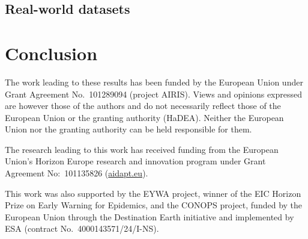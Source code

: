 \documentclass{article}
\theoremstyle{plain}
\theoremstyle{definition}
\theoremstyle{remark}
\begin{document}
\vspace{-0.5em}
\subsection{Real-world datasets}
\label{sec:real-datasets}


\vspace{-0.5em}
\section{Conclusion}\label{sec:conclusion}
\label{sec:limitations}


\begin{ack}
The work leading to these results has been funded by the European Union under Grant Agreement No.~101289094 (project AIRIS). Views and opinions expressed are however those of the authors and do not necessarily reflect those of the European Union or the granting authority (HaDEA). Neither the European Union nor the granting authority can be held responsible for them.

The research leading to this work has received funding from the European Union's Horizon Europe research and innovation program under Grant Agreement No:~101135826 (\href{https://aidapt.eu}{aidapt.eu}).

This work was also supported by the EYWA project, winner of the EIC Horizon Prize on Early Warning for Epidemics, and the CONOPS project, funded by the European Union through the Destination Earth initiative and implemented by ESA (contract No.~4000143571/24/I-NS).
\end{ack}




\appendix

\end{document}

